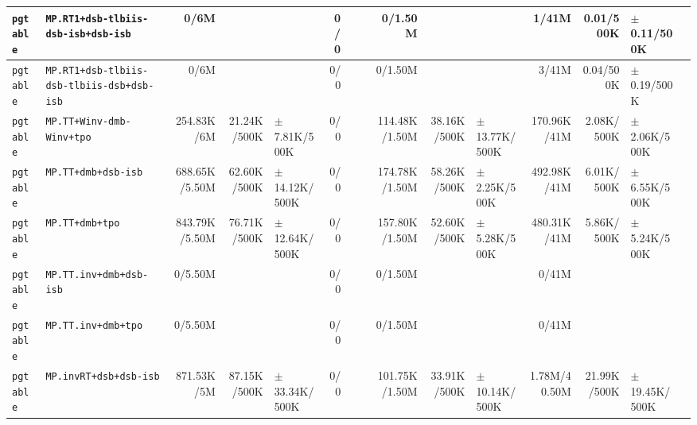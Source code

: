 \begin{tabular}{l l  | r r l | r r l | r r l | r r l l}
        \verb|pgtable| &                    \verb|MP.RT1+dsb-tlbiis-dsb-isb+dsb-isb| &           0/6M &                       &                   &            0/0 &                       &  &        0/1.50M &                       &                   &          1/41M &             0.01/500K &    $\pm$ 0.11/500K & \\ \hline 
        \verb|pgtable| &             \verb|MP.RT1+dsb-tlbiis-dsb-tlbiis-dsb+dsb-isb| &           0/6M &                       &                   &            0/0 &                       &  &        0/1.50M &                       &                   &          3/41M &             0.04/500K &    $\pm$ 0.19/500K & \\ \hline 
        \verb|pgtable| &                              \verb|MP.TT+Winv-dmb-Winv+tpo| &     254.83K/6M &           21.24K/500K &  $\pm$ 7.81K/500K &            0/0 &                       &  &  114.48K/1.50M &           38.16K/500K & $\pm$ 13.77K/500K &    170.96K/41M &            2.08K/500K &   $\pm$ 2.06K/500K & \\ \hline 
        \verb|pgtable| &                                    \verb|MP.TT+dmb+dsb-isb| &  688.65K/5.50M &           62.60K/500K & $\pm$ 14.12K/500K &            0/0 &                       &  &  174.78K/1.50M &           58.26K/500K &  $\pm$ 2.25K/500K &    492.98K/41M &            6.01K/500K &   $\pm$ 6.55K/500K & \\ \hline 
        \verb|pgtable| &                                        \verb|MP.TT+dmb+tpo| &  843.79K/5.50M &           76.71K/500K & $\pm$ 12.64K/500K &            0/0 &                       &  &  157.80K/1.50M &           52.60K/500K &  $\pm$ 5.28K/500K &    480.31K/41M &            5.86K/500K &   $\pm$ 5.24K/500K & \\ \hline 
        \verb|pgtable| &                                \verb|MP.TT.inv+dmb+dsb-isb| &        0/5.50M &                       &                   &            0/0 &                       &  &        0/1.50M &                       &                   &          0/41M &                       &                    & \\ \hline 
        \verb|pgtable| &                                    \verb|MP.TT.inv+dmb+tpo| &        0/5.50M &                       &                   &            0/0 &                       &  &        0/1.50M &                       &                   &          0/41M &                       &                    & \\ \hline 
        \verb|pgtable| &                                 \verb|MP.invRT+dsb+dsb-isb| &     871.53K/5M &           87.15K/500K & $\pm$ 33.34K/500K &            0/0 &                       &  &  101.75K/1.50M &           33.91K/500K & $\pm$ 10.14K/500K &   1.78M/40.50M &           21.99K/500K &  $\pm$ 19.45K/500K & \\ \hline 

\end{tabular}
